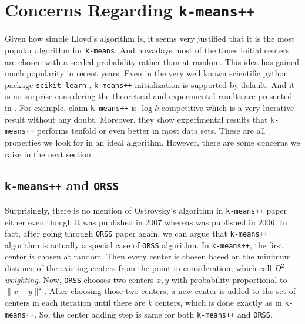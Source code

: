 \documentclass[twoside, 11pt]{article}
\begin{document}
	\section{Concerns Regarding \texttt{k-means++}}\label{sec:kmeans++vsorss}
	Given how simple Lloyd's algorithm is, it seems very justified that it is the most popular algorithm for \texttt{k-means}. And nowadays most of the times initial centers are chosen with a seeded probability rather than at random. This idea has gained much popularity in recent years. Even in the very well known scientific python package \texttt{scikit-learn} \citep{sklearn}, \texttt{k-means++} initialization is supported by default. And it is no surprise considering the theoretical and experimental results are presented in \citep{kmeans++}. For example, \cite{kmeans++} claim \texttt{k-means++} is $\log{k}$ competitive which is a very lucrative result without any doubt. Moreover, they show experimental results that \texttt{k-means++} performs tenfold or even better in most data sets. These are all properties we look for in an ideal algorithm. However, there are some concerns we raise in the next section.
	\subsection{\texttt{k-means++} and \texttt{ORSS}}
	Surprisingly, there is no mention of Ostrovsky's algorithm in \texttt{k-means++} paper either even though it was published in $2007$ whereas \cite{ostrovsky} was published in $2006$. In fact, after going through \texttt{ORSS} paper again, we can argue that \texttt{k-means++} algorithm is actually a special case of \texttt{ORSS} algorithm. In \texttt{k-means++}, the first center is chosen at random. Then every center is chosen based on the minimum distance of the existing centers from the point in consideration, which \cite{kmeans++} call $D^2$ \textit{weighting}. Now, \texttt{ORSS} chooses two centers $x,y$ with probability proportional to $\|x-y\|^2$. After choosing those two centers, a new center is added to the set of centers in each iteration until there are $k$ centers, which is done exactly as in \texttt{k-means++}. So, the center adding step is same for both \texttt{k-means++} and \texttt{ORSS}.
	
\end{document}
